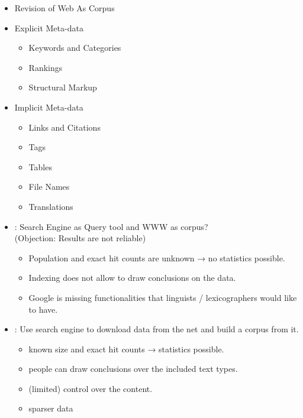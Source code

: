 \documentclass[a4paper,landscape,headrule,footrule,xetex]{foils}
\begin{document}


\maketitle


\begin{itemize}
\item Revision of Web As Corpus
\item Explicit Meta-data
  \begin{itemize}
  \item Keywords and Categories
  \item Rankings
  \item Structural Markup
  \end{itemize}
\item Implicit Meta-data
  \begin{itemize}
  \item Links and Citations
  \item Tags
  \item Tables
  \item File Names
  \item Translations
  \end{itemize}
\end{itemize}



\begin{itemize}
\item {}: Search Engine as Query tool and WWW as corpus?
\\  (Objection: Results are not reliable)
\begin{itemize}
\item Population and exact hit counts are unknown → no statistics
possible.
\item Indexing does not allow to draw conclusions on the data.
\item[\Bad] Google is missing functionalities that linguists /
lexicographers would like to have.
\end{itemize}
\item {}: Use search engine to download data from the
net and build a corpus from it.
\begin{itemize}
\item known size and exact hit counts → statistics possible.
\item people can draw conclusions over the included text types.
\item (limited) control over the content.
\item[\Bad] sparser data
\end{itemize}
\end{itemize}
\end{document}
